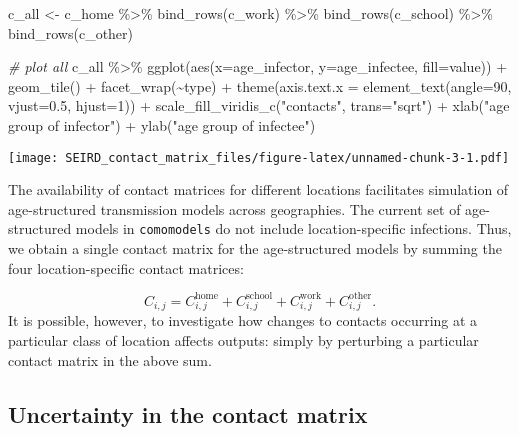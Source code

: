 \documentclass[
]{article}
\newenvironment{Shaded}{\begin{snugshade}}{\end{snugshade}}
\newcommand{\AttributeTok}[1]{\textcolor[rgb]{0.77,0.63,0.00}{#1}}
\newcommand{\CommentTok}[1]{\textcolor[rgb]{0.56,0.35,0.01}{\textit{#1}}}
\newcommand{\DecValTok}[1]{\textcolor[rgb]{0.00,0.00,0.81}{#1}}
\newcommand{\FloatTok}[1]{\textcolor[rgb]{0.00,0.00,0.81}{#1}}
\newcommand{\FunctionTok}[1]{\textcolor[rgb]{0.00,0.00,0.00}{#1}}
\newcommand{\NormalTok}[1]{#1}
\newcommand{\OtherTok}[1]{\textcolor[rgb]{0.56,0.35,0.01}{#1}}
\newcommand{\SpecialCharTok}[1]{\textcolor[rgb]{0.00,0.00,0.00}{#1}}
\newcommand{\StringTok}[1]{\textcolor[rgb]{0.31,0.60,0.02}{#1}}
\begin{document}
\begin{Shaded}
\begin{Highlighting}[]
\NormalTok{c\_all }\OtherTok{\textless{}{-}}\NormalTok{ c\_home }\SpecialCharTok{\%\textgreater{}\%}
  \FunctionTok{bind\_rows}\NormalTok{(c\_work) }\SpecialCharTok{\%\textgreater{}\%} 
  \FunctionTok{bind\_rows}\NormalTok{(c\_school) }\SpecialCharTok{\%\textgreater{}\%} 
  \FunctionTok{bind\_rows}\NormalTok{(c\_other)}

\CommentTok{\# plot all}
\NormalTok{c\_all }\SpecialCharTok{\%\textgreater{}\%}
  \FunctionTok{ggplot}\NormalTok{(}\FunctionTok{aes}\NormalTok{(}\AttributeTok{x=}\NormalTok{age\_infector, }\AttributeTok{y=}\NormalTok{age\_infectee, }\AttributeTok{fill=}\NormalTok{value)) }\SpecialCharTok{+} \FunctionTok{geom\_tile}\NormalTok{() }\SpecialCharTok{+}
  \FunctionTok{facet\_wrap}\NormalTok{(}\SpecialCharTok{\textasciitilde{}}\NormalTok{type) }\SpecialCharTok{+}
  \FunctionTok{theme}\NormalTok{(}\AttributeTok{axis.text.x =} \FunctionTok{element\_text}\NormalTok{(}\AttributeTok{angle=}\DecValTok{90}\NormalTok{, }\AttributeTok{vjust=}\FloatTok{0.5}\NormalTok{, }\AttributeTok{hjust=}\DecValTok{1}\NormalTok{)) }\SpecialCharTok{+}
  \FunctionTok{scale\_fill\_viridis\_c}\NormalTok{(}\StringTok{"contacts"}\NormalTok{,}
                       \AttributeTok{trans=}\StringTok{"sqrt"}\NormalTok{) }\SpecialCharTok{+}
  \FunctionTok{xlab}\NormalTok{(}\StringTok{"age group of infector"}\NormalTok{) }\SpecialCharTok{+}
  \FunctionTok{ylab}\NormalTok{(}\StringTok{"age group of infectee"}\NormalTok{)}
\end{Highlighting}
\end{Shaded}

\texttt{[image: SEIRD\_contact\_matrix\_files/figure-latex/unnamed-chunk-3-1.pdf]}

The availability of contact matrices for different locations facilitates
simulation of age-structured transmission models across geographies. The
current set of age-structured models in \texttt{comomodels} do not
include location-specific infections. Thus, we obtain a single contact
matrix for the age-structured models by summing the four
location-specific contact matrices:

\[
C_{i,j} = C_{i,j}^{\text{home}} + C_{i,j}^{\text{school}} + C_{i,j}^{\text{work}} + C_{i,j}^{\text{other}}.
\] It is possible, however, to investigate how changes to contacts
occurring at a particular class of location affects outputs: simply by
perturbing a particular contact matrix in the above sum.

\hypertarget{uncertainty-in-the-contact-matrix}{%
\subsection{Uncertainty in the contact
matrix}\label{uncertainty-in-the-contact-matrix}}
\end{document}

